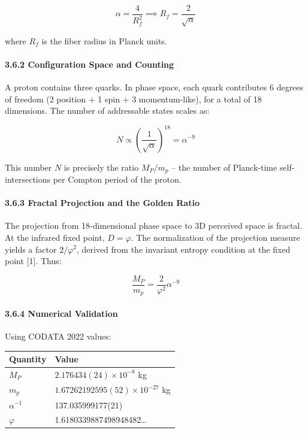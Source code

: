 \documentclass[
]{article}
\begin{document}
\[\alpha = \frac{4}{R_f^2} \implies R_f = \frac{2}{\sqrt{\alpha}}\]

where \(R_f\) is the fiber radius in Planck units.

\paragraph{3.6.2 Configuration Space and
Counting}\label{configuration-space-and-counting}

A proton contains three quarks. In phase space, each quark contributes 6
degrees of freedom (2 position + 1 spin + 3 momentum-like), for a total
of 18 dimensions. The number of addressable states scales as:

\[N \propto \left(\frac{1}{\sqrt{\alpha}}\right)^{18} = \alpha^{-9}\]

This number \(N\) is precisely the ratio \(M_P/m_p\) -- the number of
Planck-time self-intersections per Compton period of the proton.

\paragraph{3.6.3 Fractal Projection and the Golden
Ratio}\label{fractal-projection-and-the-golden-ratio}

The projection from 18-dimensional phase space to 3D perceived space is
fractal. At the infrared fixed point, \(D = \varphi\). The normalization
of the projection measure yields a factor \(2/\varphi^2\), derived from
the invariant entropy condition at the fixed point {[}1{]}. Thus:

\[\boxed{\frac{M_P}{m_p} = \frac{2}{\varphi^2} \alpha^{-9}}\]

\paragraph{3.6.4 Numerical Validation}\label{numerical-validation}

Using CODATA 2022 values:

\begin{longtable}[]{@{}ll@{}}
\toprule\noalign{}
Quantity & Value \\
\midrule\noalign{}
\endhead
\bottomrule\noalign{}
\endlastfoot
\(M_P\) & \(2.176434(24) \times 10^{-8}\) kg \\
\(m_p\) & \(1.67262192595(52) \times 10^{-27}\) kg \\
\(\alpha^{-1}\) & 137.035999177(21) \\
\(\varphi\) & 1.6180339887498948482\ldots{} \\
\end{longtable}
\end{document}
